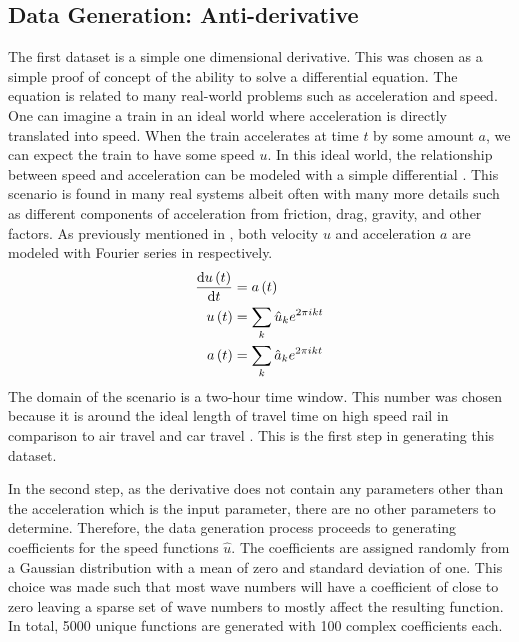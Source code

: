 \subsection{Data Generation: Anti-derivative}
\noindent The first dataset is a simple one dimensional derivative. This was chosen as a simple proof of concept of the ability to solve a differential equation. The equation is related to many real-world problems such as acceleration and speed. One can imagine a train in an ideal world where acceleration is directly translated into speed. When the train accelerates at time \(t \) by some amount \(a \), we can expect the train to have some speed \(u \). In this ideal world, the relationship between speed and acceleration can be modeled with a simple differential . This scenario is found in many real systems albeit often with many more details such as different components of acceleration from friction, drag, gravity, and other factors.
As previously mentioned in , both velocity \(u \) and acceleration \(a \) are modeled with Fourier series in  respectively.
\begin{align}
  \dv{u\left( t \right)}{t} & = a\left( t \right) \label{eq:derivative}                                                           \\
  u\left( t \right)           & = \sum_{k} \hat{u}_k e^{2\pi ikt} \label{eq:fourier_speed}        \\
  a\left( t \right)           & = \sum_{k} \hat{a}_k e^{2\pi ikt} \label{eq:fourier_acceleration}
\end{align}
The domain of the scenario is a two-hour time window. This number was chosen because it is around the ideal length of travel time on high speed rail in comparison to air travel and car travel \autocite{givoniDevelopmentImpactModern2006,wangEfficiencySpatialEquity2019,wrro2236}. This is the first step in generating this dataset.

In the second step, as the derivative  does not contain any parameters other than the acceleration which is the input parameter, there are no other parameters to determine. Therefore, the data generation process proceeds to generating coefficients for the speed functions \(\hat{u} \). The coefficients are assigned randomly from a Gaussian distribution with a mean of zero and standard deviation of one. This choice was made such that most wave numbers will have a coefficient of close to zero leaving a sparse set of wave numbers to mostly affect the resulting function. In total, 5000 unique functions are generated with 100 complex coefficients each.

